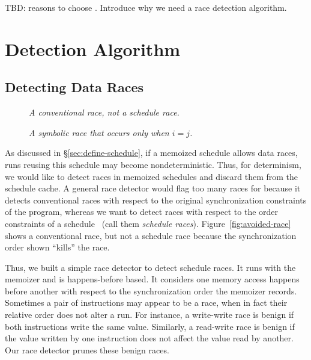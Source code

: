 TBD: reasons to choose \tern. Introduce why we need a race detection algorithm.

\section{Detection Algorithm} \label{sec:bugs-detection}

\subsection{Detecting Data Races} \label{sec:detect-race}

\begin{figure}
\begin{minipage}[t]{0.45\linewidth}
\tiny
{}
\caption{\small\em A conventional race, not a schedule race.}
\label{fig:avoided-race}
\end{minipage}
\hfill
\begin{minipage}[t]{0.48\linewidth}
\tiny 
{}
\vspace{-.2in}
\caption{\small\em A symbolic race that occurs only when $i=j$.}
\label{fig:symbolic-race}
\end{minipage}
\vspace{-.2in}
\end{figure}

As discussed in \S\ref{sec:define-schedule}, if a memoized schedule allows
data races, runs reusing this schedule may become nondeterministic.  Thus,
for determinism, we would like to detect races in memoized schedules and
discard them from the schedule cache.  A general race detector would flag
too many races for \tern because it detects conventional races with respect
to the original synchronization constraints of the program, whereas we
want to detect races with respect to the order constraints of a
schedule~\cite{recplay:tocs} (call them \emph{schedule races}).
Figure~\ref{fig:avoided-race} shows a conventional race, but not a
schedule race because the synchronization order shown ``kills'' the race.

Thus, we built a simple race detector to detect schedule races.  It runs
with the memoizer and is happens-before based.  It considers one memory
access happens before another with respect to the synchronization order
the memoizer records.  Sometimes a pair of instructions may appear to be a
race, when in fact their relative order does not alter a run.  For
instance, a write-write race is benign if both instructions write the same
value.  Similarly, a read-write race is benign if the value written by one
instruction does not affect the value read by another.  Our race detector
prunes these benign races.

